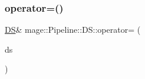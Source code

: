 \hypertarget{structmage_1_1_pipeline_1_1_d_s_aac8c805a6c281a1b2849366847f74fdd}{}\label{structmage_1_1_pipeline_1_1_d_s_aac8c805a6c281a1b2849366847f74fdd} 
\subsubsection{\texorpdfstring{operator=()}{operator=()}\hspace{0.1cm}{\footnotesize\ttfamily [2/2]}}
{\footnotesize\ttfamily \hyperlink{structmage_1_1_pipeline_1_1_d_s}{DS}\& mage\+::\+Pipeline\+::\+D\+S\+::operator= (\begin{DoxyParamCaption}\item[{\hyperlink{structmage_1_1_pipeline_1_1_d_s}{DS} \&\&}]{ds }\end{DoxyParamCaption})\hspace{0.3cm}{\ttfamily [delete]}}

